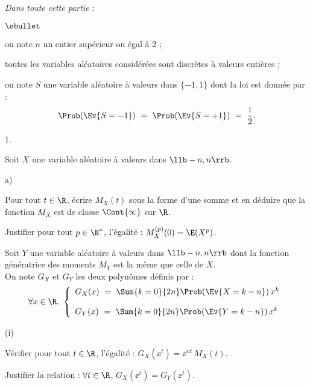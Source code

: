 \documentclass[11pt]{article}%
\begin{document}
\noindent
{\it Dans toute cette partie} :
\begin{noliste}{$\sbullet$}
\item on note $n$ un entier supérieur ou égal à $2$ ;
  
\item toutes les variables aléatoires considérées sont discrètes à
  valeurs entières ;
  
\item on note $S$ une variable aléatoire à valeurs dans $\{-1,1\}$
  dont la loi est donnée par :
  \[
    \Prob(\Ev{S = -1}) \ = \ \Prob(\Ev{S = +1}) \ = \ \dfrac{1}{2}.
  \]
\end{noliste}


\newpage


\begin{noliste}{1.}
  \setlength{\itemsep}{4mm}
\item Soit $X$ une variable aléatoire à valeurs dans $\llb -n, n\rrb$.
  \begin{noliste}{a)}
    \setlength{\itemsep}{2mm}
  \item Pour tout $t\in \R$, écrire $M_X(t)$ sous la forme d'une somme
    et en déduire que la fonction $M_X$ est de classe $\Cont{\infty}$
    sur $\R$.
    
  \item Justifier pour tout $p \in \N^*$, l'égalité : $M_X^{(p)}(0) =
    \E(X^p)$.
    
  \item Soit $Y$ une variable aléatoire à valeurs dans $\llb -n,n
    \rrb$ dont la fonction génératrice des moments $M_Y$ est la même
    que celle de $X$.\\
    On note $G_X$ et $G_Y$ les deux polynômes définis par :
    \[
      \forall x \in \R, \ \left\{
        \begin{array}{l}
          G_X(x) \ = \ \Sum{k=0}{2n} \Prob(\Ev{X = k-n}) \, x^k
          \\[.4cm]
          G_Y(x) \ = \ \Sum{k=0}{2n} \Prob(\Ev{Y = k-n}) \, x^k
        \end{array}
      \right.
    \]
    \begin{nonoliste}{(i)}
      \setlength{\itemsep}{2mm}
    \item Vérifier pour tout $t\in \R$, l'égalité : $G_X(\ee^t) =
      \ee^{nt} \, M_X(t)$.
      
    \item Justifier la relation : $\forall t \in \R$, $G_X(\ee^t) =
      G_Y(\ee^t)$.
      

\end{nonoliste}
\end{noliste}
\end{noliste}
\end{document}
